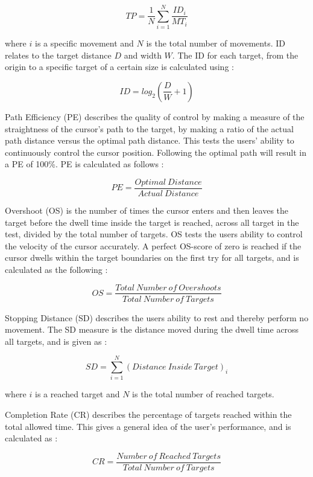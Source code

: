 \begin{equation} \label{eq:TP}
TP=\frac{1}{N}\sum_{i=1}^{N} \frac{ID_i}{MT_i} 
\end{equation}

where $i$ is a specific movement and $N$ is the total number of movements. ID relates to the target distance $D$ and width $W$. The ID for each target, from the origin to a specific target of a certain size is calculated using \cite{Scheme2013,Fitts1954}:

\begin{equation} \label{eq:ID}
ID=log_2(\frac{D}{W}+1)
\end{equation}

Path Efficiency (PE) describes the quality of control by making a measure of the straightness of the cursor's path to the target, by making a ratio of the actual path distance versus the optimal path distance. This tests the users' ability to continuously control the cursor position. Following the optimal path will result in a PE of 100\%. PE is calculated as follows \cite{Scheme2013, Poulton2013}:       

\begin{equation} \label{eq:PE}
PE = \frac{Optimal ~ Distance}{Actual ~ Distance}
\end{equation}		 

Overshoot (OS) is the number of times the cursor enters and then leaves the target before the dwell time inside the target is reached, across all target in the test, divided by the total number of targets. OS tests the users ability to control the velocity of the cursor accurately. A perfect OS-score of zero is reached if the cursor dwells within the target boundaries on the first try for all targets, and is calculated as the following \cite{Scheme2013, Poulton2013}:

\begin{equation} \label{eq:OS}
OS = \frac{Total ~ Number ~ of ~ Overshoots}{Total ~ Number ~ of ~ Targets}
\end{equation}

Stopping Distance (SD) describes the users ability to rest and thereby perform no movement. The SD measure is the distance moved during the dwell time across all targets, and is given as \cite{Scheme2013}:

\begin{equation} \label{eq:SD}
SD = \sum_{i=1}^{N} (Distance ~ Inside ~ Target)_i
\end{equation}

where $i$ is a reached target and $N$ is the total number of reached targets.

Completion Rate (CR) describes the percentage of targets reached within the total allowed time. This gives a general idea of the user's performance, and is calculated as \cite{Scheme2013,Simon2011}: 

\begin{equation} \label{eq:CR}
CR = \frac{Number ~ of ~ Reached ~ Targets}{Total ~ Number ~ of ~ Targets}
\end{equation}
